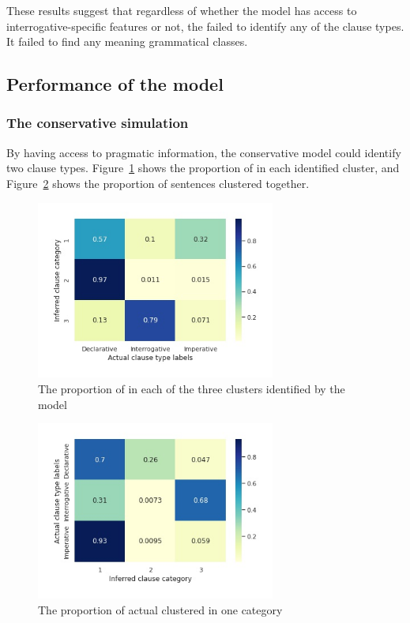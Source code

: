 These results suggest that regardless of whether the model has access to interrogative-specific features or not, the \dlearnerabbr{} failed to identify any of the clause types. It failed to find any meaning grammatical classes. 



\subsection{Performance of the \plearnerabbr{} model}
\label{sec:mancl:model:results:d}
\subsubsection{The conservative simulation}
By having access to pragmatic information, the conservative \plearnerabbr{} model could identify two clause types. Figure~\ref{fig:man-target-conservative-heatmap} shows the proportion of \diis{} in each identified cluster, and Figure~\ref{fig:man-target-conservative-heatrev} shows the proportion of sentences clustered together. 

\begin{figure}[H]
    \centering
    \includegraphics[width=0.7\textwidth]{figures/man-target-conservative-heatmap.jpg}
    \caption{The proportion of \diis{} in each of the three clusters identified by the \plearnerabbr{} model}
    \label{fig:man-target-conservative-heatmap}
\end{figure}




\begin{figure}[H]
    \centering
    \includegraphics[width=0.7\textwidth]{figures/man-target-conservative-heatrev.jpg}
    \caption{The proportion of actual \diis{} clustered in one category}
    \label{fig:man-target-conservative-heatrev}
\end{figure}


